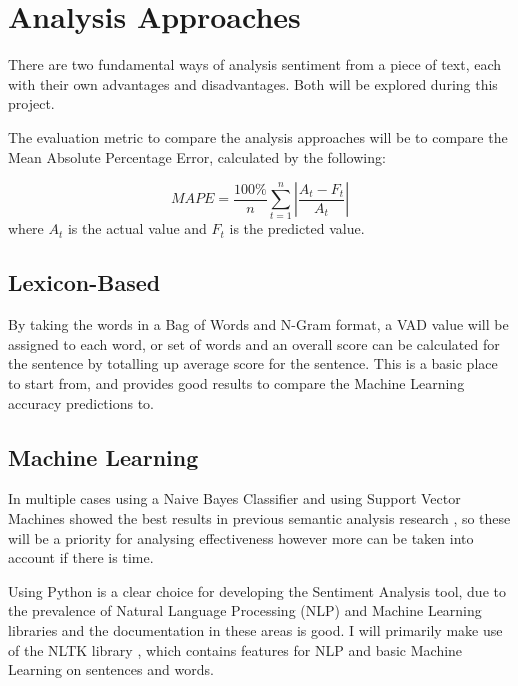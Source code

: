 \section{Analysis Approaches}

There are two fundamental ways of analysis sentiment from a piece of text, each with their own advantages and disadvantages. Both will be explored during this project.

The evaluation metric to compare the analysis approaches will be to compare the  Mean Absolute Percentage Error, calculated by the following: 

$$ MAPE = \frac{100\%}{n} \sum_{t=1}^{n} \left| \frac{A_t-F_t}{A_t} \right| $$
where $A_t$ is the actual value and $F_t$ is the predicted value.

\subsection{Lexicon-Based}

By taking the words in a Bag of Words and N-Gram format, a VAD value will be assigned to each word, or set of words and an overall score can be calculated for the sentence by totalling up average score for the sentence. This is a basic place to start from, and provides good results to compare the Machine Learning accuracy predictions to. 

\subsection{Machine Learning}

In multiple cases using a Naive Bayes Classifier and using Support Vector Machines showed the best results in previous semantic analysis research \cite{kolchyna2015twitter} \cite{go2009twitter}, so these will be a priority for analysing effectiveness however more can be taken into account if there is time.

Using Python is a clear choice for developing the Sentiment Analysis tool, due to the prevalence of Natural Language Processing (NLP) and Machine Learning libraries and the documentation in these areas is good. I will primarily make use of the NLTK library \cite{NLTKBook}, which contains features for NLP and basic Machine Learning on sentences and words. 

